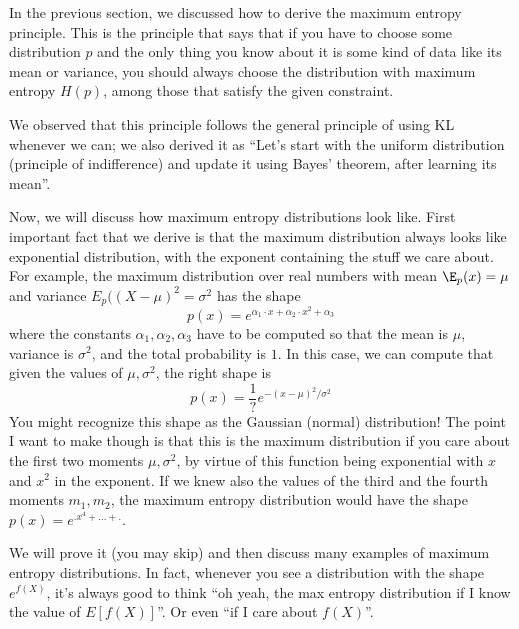 \documentclass{article}
\begin{document}

In the previous section, we discussed how to derive the maximum entropy principle. This is the principle that says that if you have to choose some distribution $p$ and the only thing you know about it is some kind of data like its mean or variance, you should always choose the distribution with maximum entropy $H(p)$, among those that satisfy the given constraint. 

We observed that this principle follows the general principle of using KL whenever we can; we also derived it as  ``Let's start with the uniform distribution (principle of indifference) and update it using Bayes' theorem, after learning its mean''. 

Now, we will discuss how maximum entropy distributions look like. First important fact that we derive is that the maximum distribution always looks like exponential distribution, with the exponent containing the stuff we care about. For example, the maximum distribution over real numbers with mean $\E_p(x) = \mu$ and variance $E_p((X - \mu)^2 = \sigma^2$ has the shape 
\[
p(x) = e^{\alpha_1 \cdot x + \alpha_2 \cdot x^2 + \alpha_3}
\]
where the constants $\alpha_1, \alpha_2, \alpha_3$ have to be computed so that the mean is $\mu$, variance is $\sigma^2$, and the total probability is $1$. In this case, we can compute that given the values of $\mu, \sigma^2$, the right shape is 
\[
p(x) = \frac{1}{?} e^{-(x-\mu)^2 / \sigma^2}
\]
You might recognize this shape as the Gaussian (normal) distribution! The point I want to make though is that this is the maximum distribution if you care about the first two moments $\mu, \sigma^2$, by virtue of this function being exponential with $x$ and $x^2$ in the exponent. If we knew also the values of the third and the fourth moments $m_1, m_2$, the maximum entropy distribution would have the shape $p(x) = e^{.x^4 + ... + .}$. 

We will prove it (you may skip) and then discuss many examples of maximum entropy distributions. In fact, whenever you see a distribution with the shape $e^{f(X)}$, it's always good to think ``oh yeah, the max entropy distribution if I know the value of $E[f(X)]$''. Or even ``if I care about $f(X)$''. 
\end{document}
